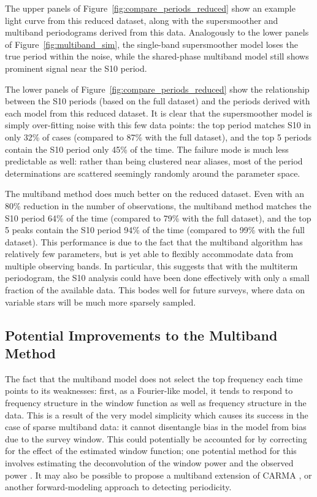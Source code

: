 \documentclass{emulateapj}
\newcommand{\Fig}[1]{Figure~\ref{fig:#1}}
\newcommand{\fig}[1]{\Fig{#1}}
\begin{document}
The upper panels of \fig{compare_periods_reduced} show an example light curve from this reduced dataset, along with the supersmoother and multiband periodograms derived from this data. Analogously to the lower panels of \fig{multiband_sim}, the single-band supersmoother model loses the true period within the noise, while the shared-phase multiband model still shows prominent signal near the S10 period.

The lower panels of \fig{compare_periods_reduced} show the relationship between the S10 periods (based on the full dataset) and the periods derived with each model from this reduced dataset. It is clear that the supersmoother model is simply over-fitting noise with this few data points: the top period matches S10 in only 32\% of cases (compared to 87\% with the full dataset), and the top 5 periods contain the S10 period only 45\% of the time. The failure mode is much less predictable as well: rather than being clustered near aliases, most of the period determinations are scattered seemingly randomly around the parameter space.

The multiband method does much better on the reduced dataset. Even with an 80\% reduction in the number of observations, the multiband method matches the S10 period 64\% of the time (compared to 79\% with the full dataset), and the top 5 peaks contain the S10 period 94\% of the time (compared to 99\% with the full dataset). This performance is due to the fact that the multiband algorithm has relatively few parameters, but is yet able to flexibly accommodate data from multiple observing bands. In particular, this suggests that with the multiterm periodogram, the S10 analysis could have been done effectively with only a small fraction of the available data. This bodes well for future surveys, where data on variable stars will be much more sparsely sampled.

\subsection{Potential Improvements to the Multiband Method}
The fact that the multiband model does not select the top frequency each time points to its weaknesses: first, as a Fourier-like model, it tends to respond to frequency structure in the window function as well as frequency structure in the data.
This is a result of the very model simplicity which causes its success in the case of sparse multiband data: it cannot disentangle bias in the model from bias due to the survey window.
This could potentially be accounted for by correcting for the effect of the estimated window function; one potential method for this involves estimating the deconvolution of the window power and the observed power \citep{Roberts87}.
It may also be possible to propose a multiband extension of CARMA \citep{Kelly14}, or another forward-modeling approach to detecting periodicity.
\end{document}

